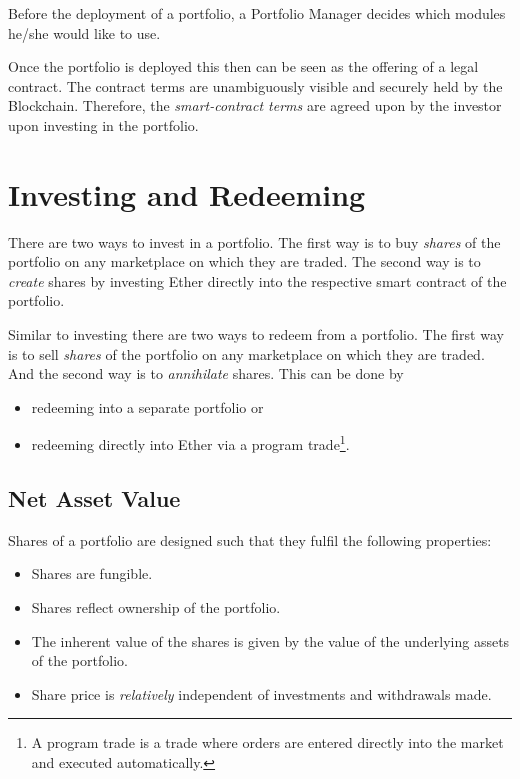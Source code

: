 \documentclass[9pt,oneside]{amsart}
\theoremstyle{plain}
\begin{document}
\begin{multicols}{2}
    Before the deployment of a portfolio, a Portfolio Manager decides which modules he/she would like to use.
    
    Once the portfolio is deployed this then can be seen as the offering of a legal contract. The contract terms are unambiguously visible and securely held by the Blockchain. Therefore, the \textit{smart-contract terms} are agreed upon by the investor upon investing in the portfolio.
        
    \section{Investing and Redeeming}\label{sec:investing}
    
    There are two ways to invest in a portfolio. The first way is to buy \textit{shares} of the portfolio on any marketplace on which they are traded. The second way is to \textit{create} shares by investing Ether directly into the respective smart contract of the portfolio.
    
    Similar to investing there are two ways to redeem from a portfolio. The first way is to sell \textit{shares} of the portfolio on any marketplace on which they are traded. And the second way is to \textit{annihilate} shares.
    This can be done by
    \begin{itemize}
        \item redeeming into a separate portfolio or
        \item redeeming directly into Ether via a program trade\footnote{A program trade is a trade where orders are entered directly into the market and executed automatically.}.
    \end{itemize}
    
    \subsection{Net Asset Value}\label{sub:defshares}
    
    Shares of a portfolio are designed such that they fulfil the following properties:
    \begin{itemize}
        \item Shares are fungible.
        \item Shares reflect ownership of the portfolio.
        \item The inherent value of the shares is given by the value of the underlying assets of the portfolio.
        \item Share price is \textit{relatively} independent of investments and withdrawals made.
    \end{itemize}
    

\end{multicols}
\end{document}
